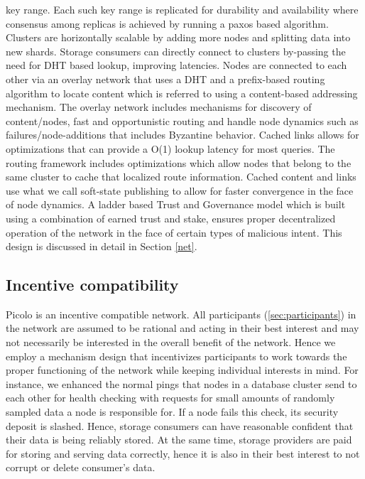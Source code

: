                                                                                                                                                                                                                                                                           {key range}. Each such key range is replicated for durability and availability where consensus among replicas is achieved by running a paxos based algorithm. Clusters are horizontally scalable by adding more nodes and splitting data into new shards. Storage consumers can directly connect to clusters by-passing the need for DHT based lookup, improving latencies.
\newline\newline
Nodes are connected to each other via an overlay network that uses a DHT and a prefix-based routing algorithm to locate
content which is referred to using a content-based addressing mechanism. The overlay network includes mechanisms for discovery of
content/nodes, fast and opportunistic routing and handle node dynamics such as failures/node-additions that includes
Byzantine behavior. Cached links allows for optimizations that can provide a O(1) lookup latency for most queries. The
routing framework includes optimizations which allow nodes that belong to the same cluster to cache that localized
route information. Cached content and links use what we call soft-state publishing to allow for faster convergence in
the face of node dynamics. A ladder based Trust and Governance model which is built using a combination of earned trust
and stake, ensures proper decentralized operation of the network in the face of certain types of malicious intent. This
design is discussed in detail in Section \ref{net}.

\subsection{Incentive compatibility}
\textsf{Picolo} is an incentive compatible network. All participants (\cref{sec:participants}) in the network are assumed to be rational and acting in their best interest and may not necessarily be interested in the overall benefit of the network. Hence we employ a mechanism design that incentivizes participants to work towards the proper functioning of the network while keeping individual interests in mind. For instance, we enhanced the normal pings that nodes in a database cluster send to each other for health checking with requests for small amounts of randomly sampled data a node is responsible for. If a node fails this check, its security deposit is slashed. Hence, storage consumers can have reasonable confident that their data is being reliably stored. At the same time, storage providers are paid for storing and serving data correctly, hence it is also in their best interest to not corrupt or delete consumer's data.

